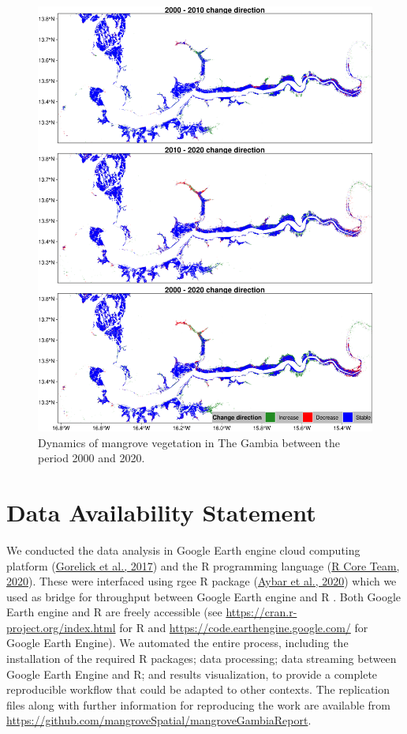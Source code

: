 \documentclass[utf8]{frontiersSCNS}
\begin{document}
\begin{figure}
\includegraphics[width=1\linewidth]{figures/Gambia_change_direction} \caption{Dynamics of mangrove vegetation in The Gambia between the period 2000 and 2020.}\label{fig:fig8}
\end{figure}

\hypertarget{data-availability-statement}{%
\section{Data Availability
Statement}\label{data-availability-statement}}

We conducted the data analysis in Google Earth engine cloud computing
platform (\protect\hyperlink{ref-Gorelick-et-al-2017}{Gorelick et al.,
2017}) and the R programming language
(\protect\hyperlink{ref-R-Core-Team-2020}{R Core Team, 2020}). These
were interfaced using rgee R package
(\protect\hyperlink{ref-Aybar-et-al-2020}{Aybar et al., 2020}) which we
used as bridge for throughput between Google Earth engine and R . Both
Google Earth engine and R are freely accessible (see
\url{https://cran.r-project.org/index.html} for R and
\url{https://code.earthengine.google.com/} for Google Earth Engine). We
automated the entire process, including the installation of the required
R packages; data processing; data streaming between Google Earth Engine
and R; and results visualization, to provide a complete reproducible
workflow that could be adapted to other contexts. The replication files
along with further information for reproducing the work are available
from \url{https://github.com/mangroveSpatial/mangroveGambiaReport}.
\end{document}
